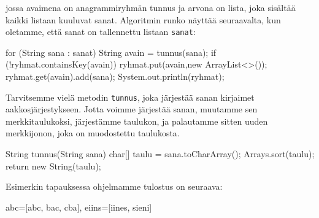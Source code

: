 jossa avaimena on anagrammiryhmän tunnus ja arvona on lista,
joka sisältää kaikki listaan kuuluvat sanat.
Algoritmin runko näyttää seuraavalta, kun oletamme,
että sanat on tallennettu listaan \texttt{sanat}:

\begin{code}
for (String sana : sanat) {
    String avain = tunnus(sana);
    if (!ryhmat.containsKey(avain)) {
        ryhmat.put(avain,new ArrayList<>());
    }
    ryhmat.get(avain).add(sana);
}
System.out.println(ryhmat);
\end{code}

Tarvitsemme vielä metodin \texttt{tunnus}, joka järjestää
sanan kirjaimet aakkosjärjestykseen.
Jotta voimme järjestää sanan, muutamme sen merkkitaulukoksi,
järjestämme taulukon, ja palautamme sitten uuden merkkijonon,
joka on muodostettu taulukosta.

\begin{code}
String tunnus(String sana) {
    char[] taulu = sana.toCharArray();
    Arrays.sort(taulu);
    return new String(taulu);
}
\end{code}

Esimerkin tapauksessa ohjelmamme tulostus on seuraava:

\begin{code}
{abc=[abc, bac, cba], eiins=[iines, sieni]}
\end{code}